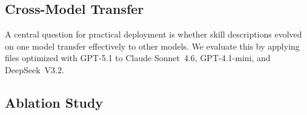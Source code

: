 \subsection{Cross-Model Transfer}
\label{ssec:cross_model}

A central question for practical deployment is whether skill descriptions evolved on one model transfer effectively to other models.
We evaluate this by applying \skillmd files optimized with GPT-5.1 to Claude Sonnet~4.6, GPT-4.1-mini, and DeepSeek~V3.2.


\subsection{Ablation Study}
\label{ssec:ablation}

\begin{table}[t]
\centering\small
\caption{Ablation study: contribution of each \gepamed component on the high-value subset.
$\Delta$Pass and $\Delta$\rbu are relative to the full \gepamed configuration.}
\setlength{\tabcolsep}{4pt}
\label{tab:ablation}
\end{table}


